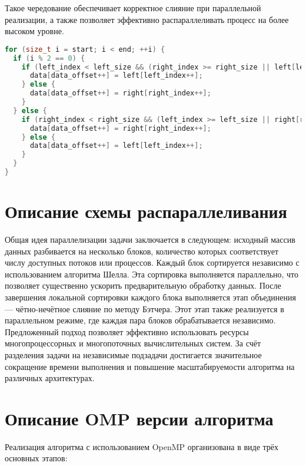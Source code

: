 \documentclass[a4paper,12pt]{article}
\begin{document}
Такое чередование обеспечивает корректное слияние при параллельной реализации, а также позволяет эффективно распараллеливать процесс на более высоком уровне.
\vspace{0.5em}
\begin{lstlisting}[language=C++,caption={Основной цикл слияния в BatcherMerge}]
for (size_t i = start; i < end; ++i) {
  if (i % 2 == 0) {
    if (left_index < left_size && (right_index >= right_size || left[left_index] <= right[right_index])) {
      data[data_offset++] = left[left_index++];
    } else {
      data[data_offset++] = right[right_index++];
    }
  } else {
    if (right_index < right_size && (left_index >= left_size || right[right_index] <= left[left_index])) {
      data[data_offset++] = right[right_index++];
    } else {
      data[data_offset++] = left[left_index++];
    }
  }
}
\end{lstlisting}
\vspace{1em}
\newpage

\section{Описание схемы распараллеливания}
Общая идея параллелизации задачи заключается в следующем: исходный массив данных разбивается на несколько блоков, количество которых соответствует числу доступных потоков или процессов. Каждый блок сортируется независимо с использованием алгоритма Шелла. Эта сортировка выполняется параллельно, что позволяет существенно ускорить предварительную обработку данных.
После завершения локальной сортировки каждого блока выполняется этап объединения — чётно-нечётное слияние по методу Бэтчера. Этот этап также реализуется в параллельном режиме, где каждая пара блоков обрабатывается независимо.
Предложенный подход позволяет эффективно использовать ресурсы многопроцессорных и многопоточных вычислительных систем. За счёт разделения задачи на независимые подзадачи достигается значительное сокращение времени выполнения и повышение масштабируемости алгоритма на различных архитектурах.
\newpage

\section{Описание OMP версии алгоритма}
Реализация алгоритма с использованием OpenMP организована в виде трёх основных этапов:
\end{document}
